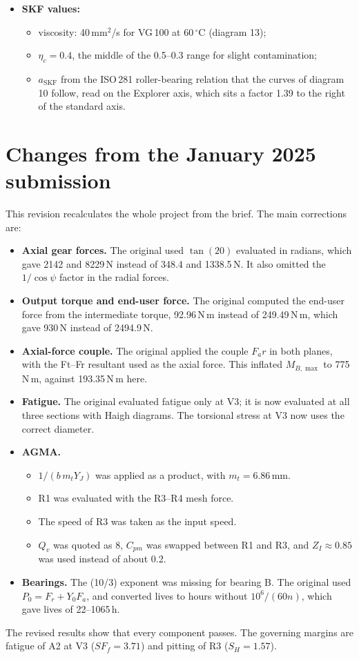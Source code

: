 \documentclass[11pt,a4paper]{article}
\begin{document}
\begin{itemize}
\begin{itemize}
  \end{itemize}
\item \textbf{SKF values:}
  \begin{itemize}
  \item viscosity: 40\,mm$^2$/s for VG\,100 at 60\,$^\circ$C (diagram 13);
  \item $\eta_c=0.4$, the middle of the 0.5--0.3 range for slight contamination;
  \item $a_{\mathrm{SKF}}$ from the ISO\,281 roller-bearing relation that the curves of diagram 10 follow, read on the Explorer axis, which sits a factor 1.39 to the right of the standard axis.
  \end{itemize}
\end{itemize}

\section{Changes from the January 2025 submission}
This revision recalculates the whole project from the brief. The main corrections are:
\begin{itemize}
\item \textbf{Axial gear forces.} The original used $\tan(20)$ evaluated in radians, which gave 2142 and 8229\,N instead of 348.4 and 1338.5\,N. It also omitted the $1/\cos\psi$ factor in the radial forces.
\item \textbf{Output torque and end-user force.} The original computed the end-user force from the intermediate torque, 92.96\,N\,m instead of 249.49\,N\,m, which gave 930\,N instead of 2494.9\,N.
\item \textbf{Axial-force couple.} The original applied the couple $F_a r$ in both planes, with the Ft--Fr resultant used as the axial force. This inflated $M_{B,\max}$ to 775\,N\,m, against 193.35\,N\,m here.
\item \textbf{Fatigue.} The original evaluated fatigue only at V3; it is now evaluated at all three sections with Haigh diagrams. The torsional stress at V3 now uses the correct diameter.
\item \textbf{AGMA.}
  \begin{itemize}
  \item $1/(b\,m_tY_J)$ was applied as a product, with $m_t=6.86$\,mm.
  \item R1 was evaluated with the R3--R4 mesh force.
  \item The speed of R3 was taken as the input speed.
  \item $Q_v$ was quoted as 8, $C_{pm}$ was swapped between R1 and R3, and $Z_I\approx0.85$ was used instead of about 0.2.
  \end{itemize}
\item \textbf{Bearings.} The (10/3) exponent was missing for bearing B. The original used $P_0=F_r+Y_0F_a$, and converted lives to hours without $10^6/(60n)$, which gave lives of 22--1065\,h.
\end{itemize}
The revised results show that every component passes. The governing margins are fatigue of A2 at V3 ($SF_f=3.71$) and pitting of R3 ($S_H=1.57$).
\end{document}
